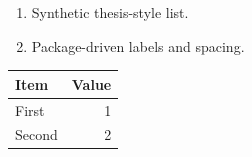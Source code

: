 \documentclass{article}
\begin{document}
\onehalfspacing
\begin{enumerate}[label=\alph*)]
\item Synthetic thesis-style list.
\item Package-driven labels and spacing.
\end{enumerate}
\begin{tabular}{lr}\toprule Item&Value\\\midrule First&1\\Second&2\\\bottomrule\end{tabular}
\end{document}

